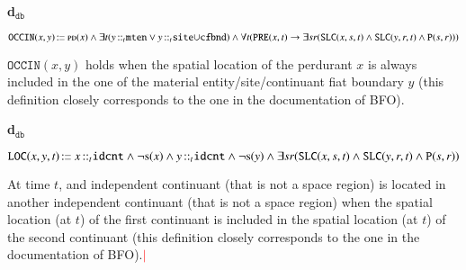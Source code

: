 \documentclass[ao]{iosart2x}
\newcommand{\nb}[1]{\textcolor{red}{$|$}\marginpar{\hspace*{-0cm}\parbox{20mm}{\scriptsize\raggedright\textcolor{red}{#1}}}}
\newcommand{\bfoDefLabel}{\textrm{d$_\texttt{b}$}}
\newcommand{\dbDefLabel}{\textrm{d$_\texttt{db}$}}
\newcounter{cntdbdf}
\newcommand{\dbdf}[1]{\refstepcounter{cntdbdf}\begin{small}{\bf \dbDefLabel\thecntdbdf\label{#1}}\end{small}}
\newcommand{\refbfodf}[1]{({\bfoDefLabel}\ref{#1})}
\newcommand{\pr}[1]{\mathtt{#1}}
\newcommand{\cn}[1]{\mathtt{#1}}
\newcommand\textequal{%
 \rule[.08ex]{5pt}{0.35pt}\llap{\rule[.78ex]{5pt}{0.35pt}}}
\newcommand{\sdef}{{\hspace{1.5pt}:\hspace{-2.5pt}\textequal\hspace{3pt}}}
\newcommand{\dolce}{{\textsc{dolce}}}
\newcommand {\PDdcat} {\textsc{pd}}
\newcommand {\Sdcat} {\textsc{s}}
\newcommand {\Pd} {\ensuremath{\pr{P}}}
\newcommand {\PREd} {\ensuremath{\pr{PRE}}}
\newcommand {\SLCd} {\ensuremath{\pr{SLC}}}
\newcommand{\idcntbcat}{\cn{idcnt}}
\newcommand{\mtenbcat}{\cn{mten}}
\newcommand{\sitebcat}{\cn{site}}
\newcommand{\cfbndbcat}{\cn{cfbnd}}
\newcommand{\bfoiof}[1]{{\,::_{#1\:\!}}}
\newcommand{\bfooccurs}{\pr{OCCIN}}
\newcommand{\bfolocated}{\pr{LOC}}
\begin{document}
\item[\dbdf{d2b_occurs}] $\bfooccurs(x,y) \sdef \PDdcat(x) \land \exists t(y \bfoiof{t} \mtenbcat \lor y \bfoiof{t} \sitebcat{\cup}\cfbndbcat) \land \\ 
\mbox{}\hfill\forall t(\PREd(x,t) \to \exists sr(\SLCd(x,s,t) \land \SLCd(y,r,t) \land \Pd(s,r)))$

\vspace{1pt}
$\bfooccurs(x,y)$ holds when the spatial location of the perdurant $x$ is always included in the one of the material entity/site/continuant fiat boundary $y$ (this definition closely corresponds to the one in the documentation of BFO).


\item[\dbdf{d2b_located}] $\bfolocated(x,y,t) \sdef x \bfoiof{t} \idcntbcat \land \neg\Sdcat(x) \land y \bfoiof{t} \idcntbcat \land \neg\Sdcat(y) \land
\exists sr(\SLCd(x,s,t) \land \SLCd(y,r,t) \land \Pd(s,r))$

\vspace{1pt}
At time $t$, and independent continuant (that is not a space region) is located in another independent continuant (that is not a space region) when the spatial location (at $t$) of the first continuant is included in the spatial location (at $t$) of the second continuant (this definition closely corresponds to the one in the documentation of BFO).\nb{SB: sopra diciamo che la parte formale ha priorità sull'altra documentazione, verificare che questo caso non contraddica quella affermazione}

%
\end{document}
